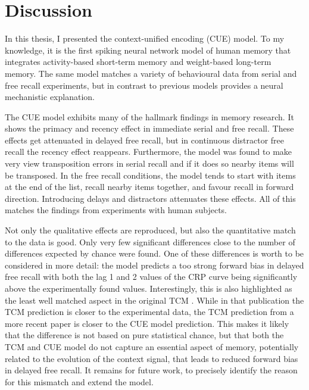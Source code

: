 \chapter{Discussion}
In this thesis, I presented the context-unified encoding (CUE) model.
To my knowledge, it is the first spiking neural network model of human memory that integrates activity-based short-term memory and weight-based long-term memory.
The same model matches a variety of behavioural data from serial and free recall experiments, but in contrast to previous models provides a neural mechanistic explanation.

The CUE model exhibits many of the hallmark findings in memory research.
It shows the primacy and recency effect in immediate serial and free recall.
These effects get attenuated in delayed free recall, but in continuous distractor free recall the recency effect reappears.
Furthermore, the model was found to make very view transposition errors in serial recall and if it does so nearby items will be transposed.
In the free recall conditions, the model tends to start with items at the end of the list, recall nearby items together, and favour recall in forward direction.
Introducing delays and distractors attenuates these effects.
All of this matches the findings from experiments with human subjects.

Not only the qualitative effects are reproduced, but also the quantitative match to the data is good.
Only very few significant differences close to the number of differences expected by chance were found.
One of these differences is worth to be considered in more detail: the model predicts a too strong forward bias in delayed free recall with both the lag \num{1} and \num{2} values of the CRP curve being significantly above the experimentally found values.
Interestingly, this is also highlighted as the least well matched aspect in the original TCM \parencite{Howard2002}.
While in that publication the TCM prediction is closer to the experimental data, the TCM prediction from a more recent paper \parencite{Sederberg2008} is closer to the CUE model prediction.
This makes it likely that the difference is not based on pure statistical chance, but that both the TCM and CUE model do not capture an essential aspect of memory, potentially related to the evolution of the context signal, that leads to reduced forward bias in delayed free recall.
It remains for future work, to precisely identify the reason for this mismatch and extend the model.

